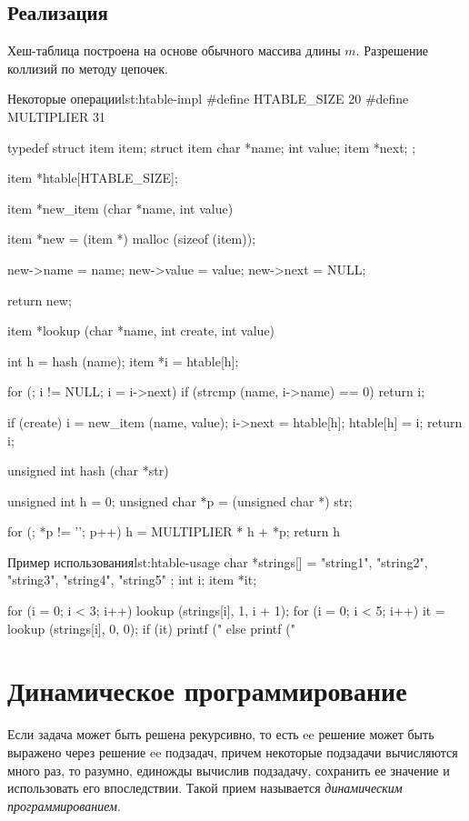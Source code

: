 \subsection{Реализация}
Хеш-таблица построена на основе обычного массива длины $m$. Разрешение коллизий по методу цепочек.

\begin{clst}{Некоторые операции}{lst:htable-impl}
#define HTABLE_SIZE 20
#define MULTIPLIER  31

typedef struct item item;
struct item {
  char *name;
  int value;
  item *next;
};

item *htable[HTABLE_SIZE];

item *new_item (char *name, int value) {
  item *new = (item *) malloc (sizeof (item));

  new->name = name;
  new->value = value;
  new->next = NULL;

  return new;
}

item *lookup (char *name, int create, int value) {
  int h = hash (name);
  item *i = htable[h];

  for (; i != NULL; i = i->next)
    if (strcmp (name, i->name) == 0)
      return i;

  if (create) {
    i = new_item (name, value);
    i->next = htable[h];
    htable[h] = i;
  }
  return i;
}

unsigned int hash (char *str) {
  unsigned int h = 0;
  unsigned char *p = (unsigned char *) str;

  for (; *p != '\0'; p++)
    h = MULTIPLIER * h + *p;
  return h %
}
\end{clst}

\begin{clst}{Пример использования}{lst:htable-usage}
char *strings[] = { "string1", "string2", "string3",
                    "string4", "string5" };
int i;
item *it;

for (i = 0; i < 3; i++)
  lookup (strings[i], 1, i + 1);
for (i = 0; i < 5; i++) {
  it = lookup (strings[i], 0, 0);
  if (it)
    printf ("%
  else
    printf ("%
}
\end{clst}

\section{Динамическое программирование}
\label{sec:dyn-programming}

Если задача может быть решена рекурсивно, то есть ee решение может быть выражено через решение ee подзадач, причем некоторые подзадачи вычисляются много раз, то разумно, единожды вычислив подзадачу, сохранить ее значение и использовать его впоследствии. Такой прием называется \emph{динамическим программированием}.

